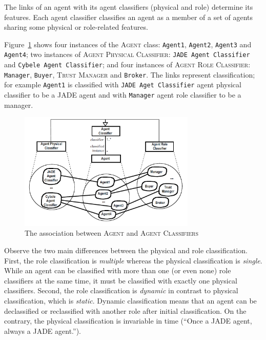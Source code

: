 The links of an agent with its agent classifiers (physical and role) determine its features.
Each agent classifier classifies an agent as a member of a set of agents sharing some physical or role-related features.

Figure~\ref{figure:onp-agent-agent-classifier-association} shows four instances of the \textsc{Agent} class: \texttt{Agent1}, \texttt{Agent2}, \texttt{Agent3} and \texttt{Agent4}; two instances of \textsc{Agent Physical Classifier}: \texttt{JADE Agent Classifier} and \texttt{Cybele Agent Classifier}; and four instances of \textsc{Agent Role Classifier}: \texttt{Manager}, \texttt{Buyer}, \textsc{Trust Manager} and \texttt{Broker}.
The links represent classification; for example \texttt{Agent1} is classified with \texttt{JADE Aget Classifier} agent physical classifier to be a JADE agent and with \texttt{Manager} agent role classifier to be a manager. 

\begin{figure}[ht]
	\centering
	\includegraphics[width=0.75\textwidth]{images/onp-agent-agent-classifier-association.png}
	\caption{The association between \textsc{Agent} and \textsc{Agent Classifiers}}
	\label{figure:onp-agent-agent-classifier-association}
\end{figure}

Observe the two main differences between the physical and role classification. First, the role classification is \textit{multiple} whereas the physical classification is \textit{single}.
While an agent can be classified with more than one (or even none) role classifiers at the same time, it must be classified with exactly one physical classifiers.
Second, the role classification is \textit{dynamic} in contrast to physical classification, which is \textit{static}.
Dynamic classification means that an agent can be declassified or reclassified with another role after initial classification. On the contrary, the physical classification is invariable in time
(``Once a JADE agent, always a JADE agent.'').

